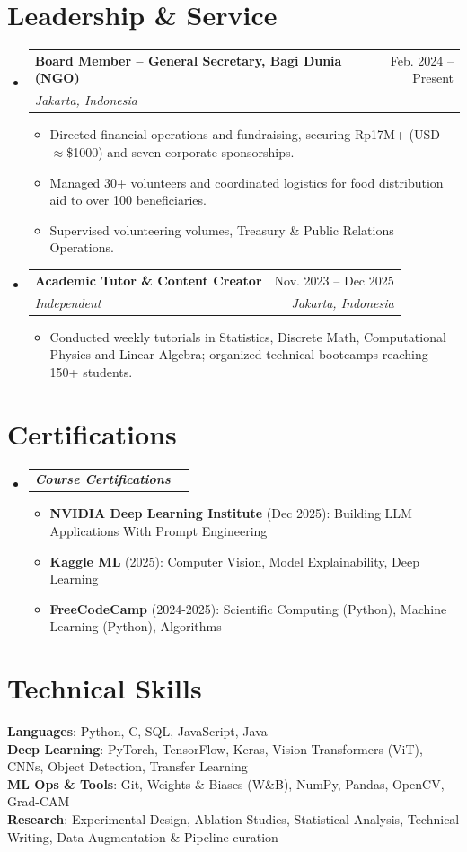 \documentclass[letterpaper,11pt]{article}
\makeatletter
\newcommand{\resumeItem}[1]{
  \item\small{
    {#1 \vspace{-2pt}}
  }
}
\newcommand{\resumeSubheading}[4]{
  \vspace{-2pt}\item
    \begin{tabular*}{0.97\textwidth}[t]{l@{\extracolsep{\fill}}r}
      \textbf{#1} & #2 \\
      \textit{\small#3} & \textit{\small #4} \\
    \end{tabular*}\vspace{-7pt}
}
\newcommand{\resumeSubSubheading}[2]{
    \item
    \begin{tabular*}{0.97\textwidth}{l@{\extracolsep{\fill}}r}
      \textit{\small#1} & \textit{\small #2} \\
    \end{tabular*}\vspace{-7pt}
}
\newcommand{\resumeSubHeadingListStart}{\begin{itemize}[leftmargin=0.15in, label={}]}
\newcommand{\resumeSubHeadingListEnd}{\end{itemize}}
\newcommand{\resumeItemListStart}{\begin{itemize}}
\newcommand{\resumeItemListEnd}{\end{itemize}\vspace{-5pt}}
\makeatother
\begin{document}
\section{\textbf{Leadership \& Service}}
  \resumeSubHeadingListStart
    \resumeSubheading
      {Board Member -- General Secretary, Bagi Dunia (NGO)}{Feb. 2024 -- Present}
      {Jakarta, Indonesia}{}
      \vspace{-1ex}
      \resumeItemListStart
        \resumeItem{Directed financial operations and fundraising, securing Rp17M+ (USD $\approx$\$1000) and seven corporate sponsorships.}
        \resumeItem{Managed 30+ volunteers and coordinated logistics for food distribution aid to over 100 beneficiaries.}
        \resumeItem{Supervised volunteering volumes, Treasury \& Public Relations Operations.}
      \resumeItemListEnd
    \resumeSubheading
      {Academic Tutor \& Content Creator}{Nov. 2023 -- Dec 2025}
      {Independent}{Jakarta, Indonesia}
      \resumeItemListStart
        \resumeItem{Conducted weekly tutorials in Statistics, Discrete Math, Computational Physics and Linear Algebra; organized technical bootcamps reaching 150+ students.}
      \resumeItemListEnd
  \resumeSubHeadingListEnd
\vspace{-3.5ex}

\section{\textbf{Certifications}}
  \resumeSubHeadingListStart
    \resumeSubSubheading
{\textbf{Course Certifications}}{}
    \resumeItemListStart
      \resumeItem{\textbf{NVIDIA Deep Learning Institute} (Dec 2025): Building LLM Applications With Prompt Engineering}
      \resumeItem{\textbf{Kaggle ML} (2025): Computer Vision, Model Explainability, Deep Learning}
      \resumeItem{\textbf{FreeCodeCamp} (2024-2025): Scientific Computing (Python), Machine Learning (Python), Algorithms}
    \resumeItemListEnd
  \resumeSubHeadingListEnd
\vspace{-4.5ex}

\section{\textbf{Technical Skills}}
\begin{itemize}[leftmargin=0.15in, label={}]
  \small{\item{
    \textbf{Languages}{:} Python, C, SQL, JavaScript, Java \\  
    \textbf{Deep Learning}{:} PyTorch, TensorFlow, Keras, Vision Transformers (ViT), CNNs, Object Detection, Transfer Learning \\  
    \textbf{ML Ops \& Tools}{:} Git, Weights \& Biases (W\&B), NumPy, Pandas, OpenCV, Grad-CAM \\ 
    \textbf{Research}{:} Experimental Design, Ablation Studies, Statistical Analysis, Technical Writing, Data Augmentation \& Pipeline curation
  }}
\end{itemize}
\end{document}
